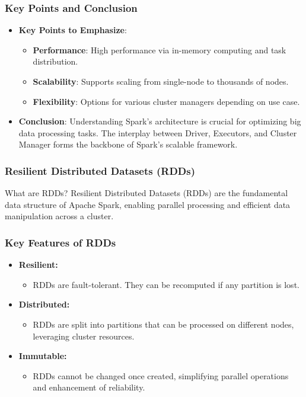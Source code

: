 \documentclass[aspectratio=169]{beamer}
\begin{document}
\begin{frame}[fragile]
    \frametitle{Key Points and Conclusion}
    \begin{itemize}
        \item \textbf{Key Points to Emphasize}:
            \begin{itemize}
                \item \textbf{Performance}: High performance via in-memory computing and task distribution.
                \item \textbf{Scalability}: Supports scaling from single-node to thousands of nodes.
                \item \textbf{Flexibility}: Options for various cluster managers depending on use case.
            \end{itemize}

        \item \textbf{Conclusion}: Understanding Spark's architecture is crucial for optimizing big data processing tasks. The interplay between Driver, Executors, and Cluster Manager forms the backbone of Spark's scalable framework.
    \end{itemize}
\end{frame}

\begin{frame}[fragile]
    \frametitle{Resilient Distributed Datasets (RDDs)}
    \begin{block}{What are RDDs?}
        Resilient Distributed Datasets (RDDs) are the fundamental data structure of Apache Spark, enabling parallel processing and efficient data manipulation across a cluster.
    \end{block}
\end{frame}

\begin{frame}[fragile]
    \frametitle{Key Features of RDDs}
    \begin{itemize}
        \item \textbf{Resilient:} 
            \begin{itemize}
                \item RDDs are fault-tolerant. They can be recomputed if any partition is lost.
            \end{itemize}
        \item \textbf{Distributed:} 
            \begin{itemize}
                \item RDDs are split into partitions that can be processed on different nodes, leveraging cluster resources.
            \end{itemize}
        \item \textbf{Immutable:} 
            \begin{itemize}
                \item RDDs cannot be changed once created, simplifying parallel operations and enhancement of reliability.
            \end{itemize}
    \end{itemize}
\end{frame}
\end{document}

